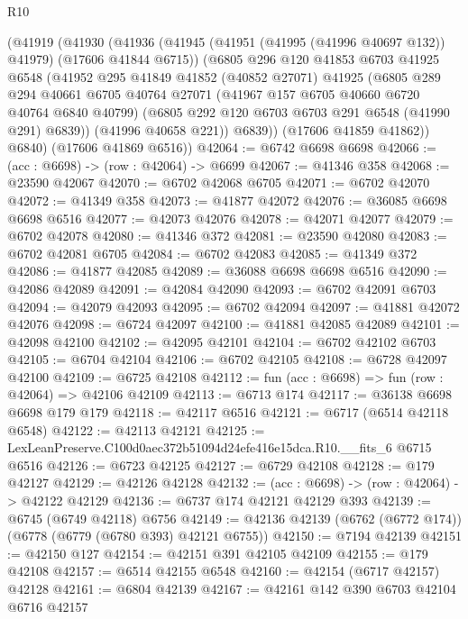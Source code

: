 \begin{lexlean}{R10}
\begin{coremodule}
      (@41919
        (@41930
          (@41936
            (@41945 (@41951 (@41995 (@41996 @40697 @132)) @41979) (@17606 @41844 @6715))
            (@6805
              @296
              @120
              @41853
              @6703
              @41925
              @6548
              (@41952
                @295
                @41849
                @41852
                (@40852 @27071)
                @41925
                (@6805
                  @289
                  @294
                  @40661
                  @6705
                  @40764
                  @27071
                  (@41967 @157 @6705 @40660 @6720 @40764 @6840 @40799)
                  (@6805 @292 @120 @6703 @6703 @291 @6548 (@41990 @291) @6839))
                (@41996 @40658 @221))
              @6839))
          (@17606 @41859 @41862))
        @6840)
      (@17606 @41869 @6516))
@42064 := @6742 @6698 @6698
@42066 := (acc : @6698) -> (row : @42064) -> @6699
@42067 := @41346 @358
@42068 := @23590 @42067
@42070 := @6702 @42068 @6705
@42071 := @6702 @42070
@42072 := @41349 @358
@42073 := @41877 @42072
@42076 := @36085 @6698 @6698 @6516
@42077 := @42073 @42076
@42078 := @42071 @42077
@42079 := @6702 @42078
@42080 := @41346 @372
@42081 := @23590 @42080
@42083 := @6702 @42081 @6705
@42084 := @6702 @42083
@42085 := @41349 @372
@42086 := @41877 @42085
@42089 := @36088 @6698 @6698 @6516
@42090 := @42086 @42089
@42091 := @42084 @42090
@42093 := @6702 @42091 @6703
@42094 := @42079 @42093
@42095 := @6702 @42094
@42097 := @41881 @42072 @42076
@42098 := @6724 @42097
@42100 := @41881 @42085 @42089
@42101 := @42098 @42100
@42102 := @42095 @42101
@42104 := @6702 @42102 @6703
@42105 := @6704 @42104
@42106 := @6702 @42105
@42108 := @6728 @42097 @42100
@42109 := @6725 @42108
@42112 := fun (acc : @6698) => fun (row : @42064) => @42106 @42109
@42113 := @6713 @174
@42117 := @36138 @6698 @6698 @179 @179
@42118 := @42117 @6516
@42121 := @6717 (@6514 @42118 @6548)
@42122 := @42113 @42121
@42125 := LexLeanPreserve.C100d0aec372b51094d24efe416e15dca.R10.__fits_6 @6715 @6516
@42126 := @6723 @42125
@42127 := @6729 @42108
@42128 := @179 @42127
@42129 := @42126 @42128
@42132 := (acc : @6698) -> (row : @42064) -> @42122 @42129
@42136 := @6737 @174 @42121 @42129 @393
@42139 := @6745 (@6749 @42118) @6756
@42149 := @42136 @42139 (@6762 (@6772 @174)) (@6778 (@6779 (@6780 @393) @42121 @6755))
@42150 := @7194 @42139
@42151 := @42150 @127
@42154 := @42151 @391 @42105 @42109
@42155 := @179 @42108
@42157 := @6514 @42155 @6548
@42160 := @42154 (@6717 @42157) @42128
@42161 := @6804 @42139
@42167 := @42161 @142 @390 @6703 @42104 @6716 @42157

\end{coremodule}
\end{lexlean}
